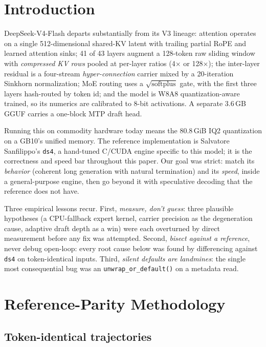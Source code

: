 \documentclass[11pt]{article}
\begin{document}
\section{Introduction}

DeepSeek-V4-Flash departs substantially from its V3 lineage: attention
operates on a single 512-dimensional shared-KV latent with trailing
partial RoPE and learned attention sinks; 41 of 43 layers augment a
128-token raw sliding window with \emph{compressed KV rows} pooled at
per-layer ratios (4$\times$ or 128$\times$); the inter-layer residual is a
four-stream \emph{hyper-connection} carrier mixed by a 20-iteration
Sinkhorn normalization; MoE routing uses a $\sqrt{\mathrm{softplus}}$
gate, with the first three layers hash-routed by token id; and the model
is W8A8 quantization-aware trained, so its numerics are calibrated to
8-bit activations. A separate 3.6\,GB GGUF carries a one-block MTP draft
head.

Running this on commodity hardware today means the 80.8\,GiB IQ2
quantization on a GB10's unified memory. The reference implementation is
Salvatore Sanfilippo's \texttt{ds4}, a hand-tuned C/CUDA engine specific
to this model; it is the correctness and speed bar throughout this paper.
Our goal was strict: match its \emph{behavior} (coherent long generation
with natural termination) and its \emph{speed}, inside a general-purpose
engine, then go beyond it with speculative decoding that the reference
does not have.

Three empirical lessons recur. First, \emph{measure, don't guess}: three
plausible hypotheses (a CPU-fallback expert kernel, carrier precision as
the degeneration cause, adaptive draft depth as a win) were each
overturned by direct measurement before any fix was attempted. Second,
\emph{bisect against a reference}, never debug open-loop: every root
cause below was found by differencing against \texttt{ds4} on
token-identical inputs. Third, \emph{silent defaults are landmines}: the
single most consequential bug was an \texttt{unwrap\_or\_default()} on a
metadata read.

\section{Reference-Parity Methodology}

\subsection{Token-identical trajectories}
\end{document}

